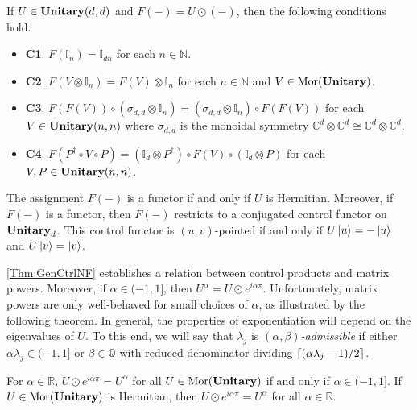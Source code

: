 \begin{corollary}
    \label{Cor:GenCtrlFunc}
    If $U \in \CatUnitary( d, d )$ and $F( - ) = U \odot ( - )$, then the following conditions hold.
    \begin{itemize}
    \item \textbf{C1}.
          $F( \mathbb{I}_n ) = \mathbb{I}_{dn}$ for each $n \in \mathbb{N}$.
    \item \textbf{C2}.
          $F( V \otimes \mathbb{I}_n ) = F( V ) \otimes \mathbb{I}_n$ for each $n \in \mathbb{N}$ and $V \in \Mor( \CatUnitary )$.
    \item \textbf{C3}.
          $F( F( V ) ) \circ ( \sigma_{d,d} \otimes \mathbb{I}_n ) = ( \sigma_{d,d} \otimes \mathbb{I}_n ) \circ F( F( V ) )$ for each $V \in \CatUnitary( n, n )$ where $\sigma_{d,d}$ is the monoidal symmetry $\mathbb{C}^d \otimes \mathbb{C}^d \cong \mathbb{C}^d \otimes \mathbb{C}^d$.
    \item \textbf{C4}.
          $F( P^\dagger \circ V \circ P ) = ( \mathbb{I}_d \otimes P^\dagger ) \circ F( V ) \circ ( \mathbb{I}_d \otimes P )$ for each $V, P \in \CatUnitary( n, n )$.
    \end{itemize}
    The assignment $F( - )$ is a functor if and only if $U$ is Hermitian.
    Moreover, if $F( - )$ is a functor, then $F( - )$ restricts to a conjugated control functor on $\CatUnitary_d$.
    This control functor is $( u, v )$-pointed if and only if $U\ket{u} = -\ket{u}$ and $U\ket{v} = \ket{v}$.
\end{corollary}

\cref{Thm:GenCtrlNF} establishes a relation between control products and matrix powers.
Moreover, if $\alpha \in (-1, 1]$, then $U^\alpha = U \odot e^{i\alpha\pi}$.
Unfortunately, matrix powers are only well-behaved for small choices of $\alpha$, as illustrated by the following theorem.
In general, the properties of exponentiation will depend on the eigenvalues of $U$.
To this end, we will say that $\lambda_j$ is \emph{$( \alpha, \beta )$-admissible} if either $\alpha \lambda_j \in ( -1, 1  ]$ or $\beta \in \mathbb{Q}$ with reduced denominator dividing $\ceil*{( \alpha \lambda_j - 1) / 2}$.

\begin{theorem}
    \label{Thm:PowAsCtrl}
    For $\alpha \in \mathbb{R}$, $U \odot e^{i\alpha\pi} = U^\alpha$ for all $U \in \Mor( \CatUnitary )$ if and only if $\alpha \in ( -1, 1 ]$.
    If $U \in \Mor( \CatUnitary )$ is Hermitian, then $U \odot e^{i\alpha\pi} = U^\alpha$ for all $\alpha \in \mathbb{R}$.
\end{theorem}

